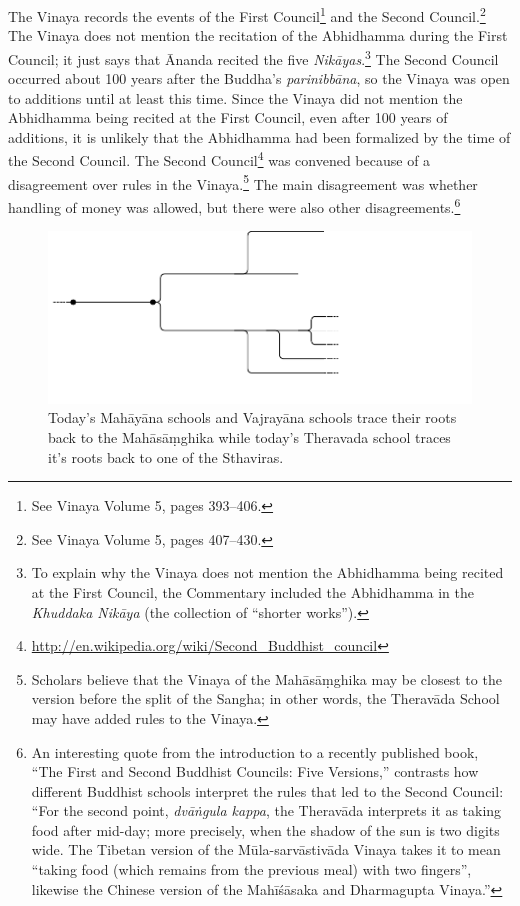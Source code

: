 The Vinaya records the events of the First Council\footnote{See Vinaya Volume 5, pages 393--406.} and the Second Council.\footnote{See Vinaya Volume 5, pages 407--430.} The Vinaya does not mention the recitation of the Abhidhamma during the First Council; it just says that Ānanda recited the five \textit{Nikāyas}.\footnote{To explain why the Vinaya does not mention the Abhidhamma being recited at the First Council, the Commentary included the Abhidhamma in the \textit{Khuddaka Nikāya} (the collection of “shorter works”).} The Second Council occurred about 100 years after the Buddha’s \textit{parinibbāna}, so the Vinaya was open to additions until at least this time. Since the Vinaya did not mention the Abhidhamma being recited at the First Council, even after 100 years of additions, it is unlikely that the Abhidhamma had been formalized by the time of the Second Council. The Second Council\footnote{\url{http://en.wikipedia.org/wiki/Second_Buddhist_council}} was convened because of a disagreement over rules in the Vinaya.\footnote{Scholars believe that the Vinaya of the Mahāsāṃghika may be closest to the version before the split of the Sangha; in other words, the Theravāda School may have added rules to the Vinaya.} The main disagreement was whether handling of money was allowed, but there were also other disagreements.\footnote{An interesting quote from the introduction to a recently published book, “The First and Second Buddhist Councils: Five Versions,” contrasts how different Buddhist schools interpret the rules that led to the Second Council: “For the second point, \textit{dvāṅgula kappa}, the Theravāda interprets it as taking food after mid-day; more precisely, when the shadow of the sun is two digits wide. The Tibetan version of the Mūla-sarvāstivāda Vinaya takes it to mean “taking food (which remains from the previous meal) with two fingers”, likewise the Chinese version of the Mahīśāsaka and Dharmagupta Vinaya.”}

\pagebreak

\begin{figure}[h]
\centering
\includegraphics[width=1\linewidth]{./Diagrams/Schools}
\caption{Today’s Mahāyāna schools and Vajrayāna schools trace their roots back to the Mahāsāṃghika while today’s Theravada school traces it’s roots back to one of the Sthaviras.}
\label{fig:Schools}
\end{figure}

